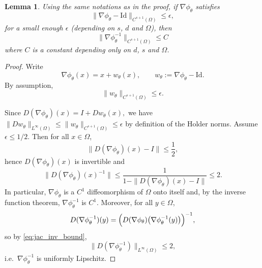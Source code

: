 \documentclass{article}
\newcommand{\1}{\mathds{1}}
\theoremstyle{plain}
\newtheorem{lemma}{Lemma}[section]
\theoremstyle{definition}
\theoremstyle{remark}
\begin{document}
\begin{lemma}
    \label{lemma:holder_inversion}
    Using the same notations as in the proof, if $\nabla \phi_\theta$ satisfies
    \begin{equation}
    \|\nabla \phi_\theta - \mathrm{Id}\|_{C^{s+1}(\Omega)} \leq \epsilon,
\end{equation}
for a small enough $\epsilon$ (depending on $s$, $d$ and $\Omega$), then 
\begin{equation}
    \|\nabla \phi_\theta^{-1}\|_{C^{s+1}(\Omega)} \leq C
\end{equation}
where $C$ is a constant depending only on $d$, $s$ and $\Omega$.
\end{lemma}
\begin{proof}
   Write
\begin{equation}
\nabla \phi_\theta(x) = x + w_\theta(x),
\qquad
w_\theta := \nabla \phi_\theta - \mathrm{Id}.
\end{equation}
By assumption,
\begin{equation}
\label{eq:ass_w_small}
\|w_\theta\|_{C^{s+1}(\Omega)} \le \epsilon.
\end{equation}

Since
$
D(\nabla\phi_\theta)(x) = I + Dw_\theta(x),
$ 
we have
$
\|Dw_\theta\|_{L^\infty(\Omega)} \le \|w_\theta\|_{C^{s+1}(\Omega)} \le \epsilon
$ by definition of the Holder norms.
Assume $\epsilon\le 1/2$. Then for all $x\in\Omega$,
\begin{equation}
\|D(\nabla\phi_\theta)(x) - I\| \le \frac12,
\end{equation}
hence $D(\nabla\phi_\theta)(x)$ is invertible and
\begin{equation}
\label{eq:jac_inv_bound}
\bigl\|D(\nabla\phi_\theta)(x)^{-1}\bigr\| \le \frac{1}{1-\|D(\nabla\phi_\theta)(x)-I\|} \le 2.
\end{equation}
In particular, $\nabla\phi_\theta$ is a $C^1$ diffeomorphism of $\Omega$ onto itself and, by the inverse function theorem,
$\nabla\phi_\theta^{-1}$ is $C^1$. Moreover, for all $y\in\Omega$,
\begin{equation}
\label{eq:Ds_formula}
D(\nabla\phi_\theta^{-1})(y)
=
\Bigl(D(\nabla\phi_\theta)\bigl(\nabla\phi_\theta^{-1}(y)\bigr)\Bigr)^{-1},
\end{equation}
so by \eqref{eq:jac_inv_bound},
\begin{equation}
\label{eq:lip_inverse}
\|D(\nabla\phi_\theta^{-1})\|_{L^\infty(\Omega)} \le 2,
\end{equation}
i.e.\ $\nabla\phi_\theta^{-1}$ is uniformly Lipschitz.


\end{proof}
\end{document}
